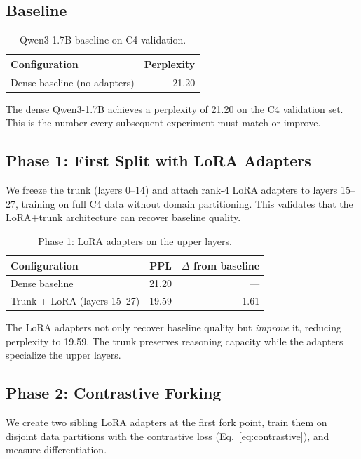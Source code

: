 \documentclass{article}
\begin{document}
\subsection{Baseline}

\begin{table}[h]
\centering
\caption{Qwen3-1.7B baseline on C4 validation.}
\label{tab:baseline}
\begin{tabular}{@{}lr@{}}
\toprule
Configuration & Perplexity \\
\midrule
Dense baseline (no adapters) & 21.20 \\
\bottomrule
\end{tabular}
\end{table}

The dense Qwen3-1.7B achieves a perplexity of 21.20 on the C4 validation set.
This is the number every subsequent experiment must match or improve.

\subsection{Phase 1: First Split with LoRA Adapters}

We freeze the trunk (layers 0--14) and attach rank-4 LoRA adapters to layers
15--27, training on full C4 data without domain partitioning. This validates
that the LoRA+trunk architecture can recover baseline quality.

\begin{table}[h]
\centering
\caption{Phase 1: LoRA adapters on the upper layers.}
\label{tab:phase1}
\begin{tabular}{@{}lrr@{}}
\toprule
Configuration & PPL & $\Delta$ from baseline \\
\midrule
Dense baseline & 21.20 & --- \\
Trunk + LoRA (layers 15--27) & 19.59 & $-$1.61 \\
\bottomrule
\end{tabular}
\end{table}

The LoRA adapters not only recover baseline quality but \emph{improve} it,
reducing perplexity to 19.59. The trunk preserves reasoning capacity while the
adapters specialize the upper layers.

\subsection{Phase 2: Contrastive Forking}

We create two sibling LoRA adapters at the first fork point, train them on
disjoint data partitions with the contrastive loss (Eq.~\ref{eq:contrastive}),
and measure differentiation.
\end{document}
